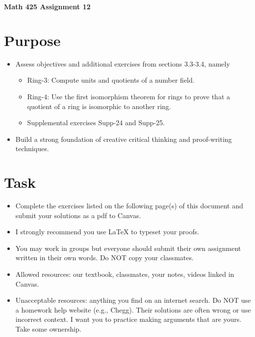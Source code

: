 \documentclass[12pt]{article}
\begin{document}
	\begin{center}
		{\Large \bf Math 425 Assignment 12}
	\end{center}
	\section*{Purpose}
	\begin{itemize}
		\item Assess objectives and additional exercises from sections 3.3-3.4, namely
		\begin{itemize} 
			\item Ring-3: Compute units and quotients of a number field.
			\item Ring-4: Use the first isomorphism theorem for rings to prove that a quotient of a ring is isomorphic to another ring.
			\item Supplemental exercises Supp-24 and Supp-25.
		\end{itemize}
		\item Build a strong foundation of creative critical thinking and proof-writing techniques.
	\end{itemize}
	\section*{Task}
	\begin{itemize}
		\item Complete the exercises listed on the following page(s) of this document and submit your solutions as a pdf to Canvas.
		\item I strongly recommend you use LaTeX to typeset your proofs.
		\item You may work in groups but everyone should submit their own assignment written in their own words.  Do NOT copy your classmates.
		\item Allowed resources: our textbook, classmates, your notes, videos linked in Canvas.
		\item Unacceptable resources: anything you find on an internet search. Do NOT use a homework help website (e.g., Chegg). Their solutions are often wrong or use incorrect context.  I want you to practice making arguments that are yours. Take some ownership.
	\end{itemize}
\end{document}
